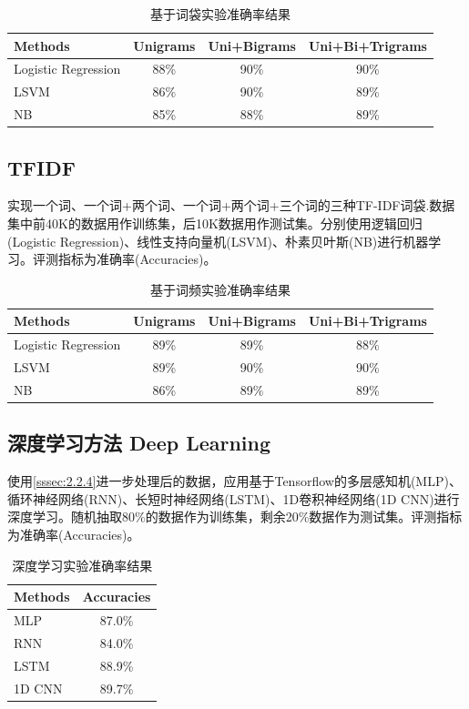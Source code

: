 \documentclass{article}
\begin{document}
\begin{table}[htbp]
    \centering
    \caption{基于词袋实验准确率结果}
    \label{tab:Accuracies of experiments_1}
    \begin{tabular}{lccc} 
        \toprule 
        Methods & Unigrams & Uni+Bigrams & Uni+Bi+Trigrams \\
        \midrule 
        Logistic Regression & 88\% & 90\% & 90\% \\
        LSVM & 86\% & 90\% & 89\% \\
        NB & 85\% & 88\% & 89\% \\
        \bottomrule 
    \end{tabular}
\end{table}

\subsection{TFIDF}
实现一个词、一个词+两个词、一个词+两个词+三个词的三种TF-IDF词袋.数据集中前40K的数据用作训练集，后10K数据用作测试集。分别使用逻辑回归(Logistic Regression)、线性支持向量机(LSVM)、朴素贝叶斯(NB)进行机器学习。评测指标为准确率(Accuracies)。

\begin{table}[htbp]
    \centering
    \caption{基于词频实验准确率结果}
    \label{tab:Accuracies of experiments_2}
    \begin{tabular}{lccc} 
        \toprule 
        Methods & Unigrams & Uni+Bigrams & Uni+Bi+Trigrams \\
        \midrule 
        Logistic Regression & 89\% & 89\% & 88\% \\
        LSVM & 89\% & 90\% & 90\% \\
        NB & 86\% & 89\% & 89\% \\
        \bottomrule 
    \end{tabular}
\end{table}

\subsection{深度学习方法 Deep Learning}
使用\ref{sssec:2.2.4}进一步处理后的数据，应用基于Tensorflow的多层感知机(MLP)、循环神经网络(RNN)、长短时神经网络(LSTM)、1D卷积神经网络(1D CNN)进行深度学习。随机抽取80\%的数据作为训练集，剩余20\%数据作为测试集。评测指标为准确率(Accuracies)。

\begin{table}[htbp]
    \centering
    \caption{深度学习实验准确率结果}
    \label{tab:Accuracies of experiments_3}
    \begin{tabular}{lc} 
        \toprule 
        Methods & Accuracies \\
        \midrule 
        MLP & 87.0\% \\
        RNN & 84.0\% \\
        LSTM & 88.9\% \\
        1D CNN & 89.7\% \\
        \bottomrule 
    \end{tabular}
\end{table}
\end{document}
